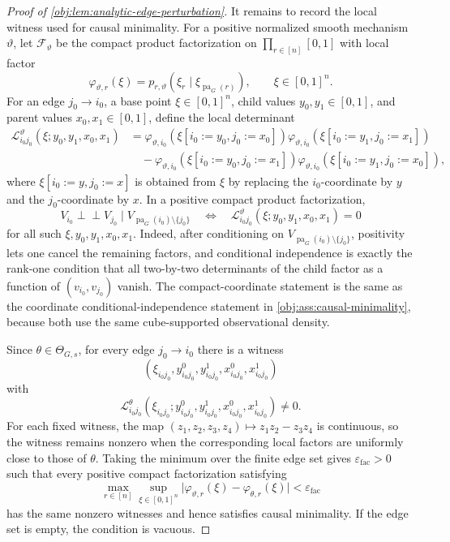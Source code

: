 \documentclass[11pt]{article}
\begin{document}
\begin{proof}[Proof of \cref{obj:lem:analytic-edge-perturbation}]
It remains to record the local witness used for causal minimality.  For a positive normalized smooth mechanism \(\vartheta\), let \(\mathcal F_\vartheta\) be the compact product factorization on \(\prod_{r\in[n]}[0,1]\) with local factor
\[
\varphi_{\vartheta,r}(\xi)=p_{r,\vartheta}(\xi_r\mid \xi_{\operatorname{pa}_G(r)}),
\qquad \xi\in[0,1]^n.
\]
For an edge \(j_0\to i_0\), a base point \(\xi\in[0,1]^n\), child values \(y_0,y_1\in[0,1]\), and parent values \(x_0,x_1\in[0,1]\), define the local determinant
\[
\begin{aligned}
\mathcal L_{i_0j_0}^{\vartheta}(\xi;y_0,y_1,x_0,x_1)
&=\varphi_{\vartheta,i_0}(\xi[i_0:=y_0,j_0:=x_0])
  \varphi_{\vartheta,i_0}(\xi[i_0:=y_1,j_0:=x_1])\\
&\quad-\varphi_{\vartheta,i_0}(\xi[i_0:=y_0,j_0:=x_1])
  \varphi_{\vartheta,i_0}(\xi[i_0:=y_1,j_0:=x_0]),
\end{aligned}
\]
where \(\xi[i_0:=y,j_0:=x]\) is obtained from \(\xi\) by replacing the \(i_0\)-coordinate by \(y\) and the \(j_0\)-coordinate by \(x\).  In a positive compact product factorization,
\[
V_{i_0}\perp\!\!\!\perp V_{j_0}
\mid V_{\operatorname{pa}_G(i_0)\setminus\{j_0\}}
\quad\Longleftrightarrow\quad
\mathcal L_{i_0j_0}^{\vartheta}(\xi;y_0,y_1,x_0,x_1)=0
\]
for all such \(\xi,y_0,y_1,x_0,x_1\).  Indeed, after conditioning on \(V_{\operatorname{pa}_G(i_0)\setminus\{j_0\}}\), positivity lets one cancel the remaining factors, and conditional independence is exactly the rank-one condition that all two-by-two determinants of the child factor as a function of \((v_{i_0},v_{j_0})\) vanish.  The compact-coordinate statement is the same as the coordinate conditional-independence statement in \cref{obj:ass:causal-minimality}, because both use the same cube-supported observational density.

Since \(\theta\in\Theta_{G,s}\), for every edge \(j_0\to i_0\) there is a witness
\[
(\xi_{i_0j_0},y_{i_0j_0}^0,y_{i_0j_0}^1,x_{i_0j_0}^0,x_{i_0j_0}^1)
\]
with
\[
\mathcal L_{i_0j_0}^{\theta}
(\xi_{i_0j_0};y_{i_0j_0}^0,y_{i_0j_0}^1,
 x_{i_0j_0}^0,x_{i_0j_0}^1)\ne0 .
\]
For each fixed witness, the map \((z_1,z_2,z_3,z_4)\mapsto z_1z_2-z_3z_4\) is continuous, so the witness remains nonzero when the corresponding local factors are uniformly close to those of \(\theta\).  Taking the minimum over the finite edge set gives \(\varepsilon_{\mathrm{fac}}>0\) such that every positive compact factorization satisfying
\[
\max_{r\in[n]}\sup_{\xi\in[0,1]^n}
\bigl|\varphi_{\vartheta,r}(\xi)-\varphi_{\theta,r}(\xi)\bigr|<\varepsilon_{\mathrm{fac}}
\]
has the same nonzero witnesses and hence satisfies causal minimality.  If the edge set is empty, the condition is vacuous.


\end{proof}
\end{document}
